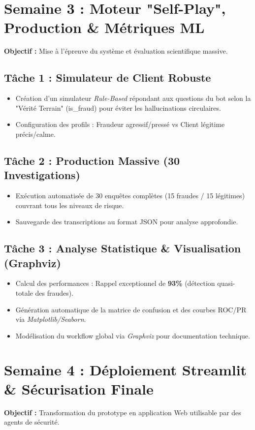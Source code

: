 \documentclass[a4paper,11pt]{article}
\begin{document}
\section{Semaine 3 : Moteur "Self-Play", Production & Métriques ML}
\textbf{Objectif :} Mise à l'épreuve du système et évaluation scientifique massive.

\subsection{Tâche 1 : Simulateur de Client Robuste}
\begin{itemize}
    \item Création d'un simulateur \textit{Rule-Based} répondant aux questions du bot selon la "Vérité Terrain" (is\_fraud) pour éviter les hallucinations circulaires.
    \item Configuration des profils : Fraudeur agressif/pressé vs Client légitime précis/calme.
\end{itemize}

\subsection{Tâche 2 : Production Massive (30 Investigations)}
\begin{itemize}
    \item Exécution automatisée de 30 enquêtes complètes (15 fraudes / 15 légitimes) couvrant tous les niveaux de risque.
    \item Sauvegarde des transcriptions au format JSON pour analyse approfondie.
\end{itemize}

\subsection{Tâche 3 : Analyse Statistique \& Visualisation (Graphviz)}
\begin{itemize}
    \item Calcul des performances : Rappel exceptionnel de \textbf{93\%} (détection quasi-totale des fraudes).
    \item Génération automatique de la matrice de confusion et des courbes ROC/PR via \textit{Matplotlib/Seaborn}.
    \item Modélisation du workflow global via \textit{Graphviz} pour documentation technique.
\end{itemize}

\section{Semaine 4 : Déploiement Streamlit & Sécurisation Finale}
\textbf{Objectif :} Transformation du prototype en application Web utilisable par des agents de sécurité.
\end{document}

